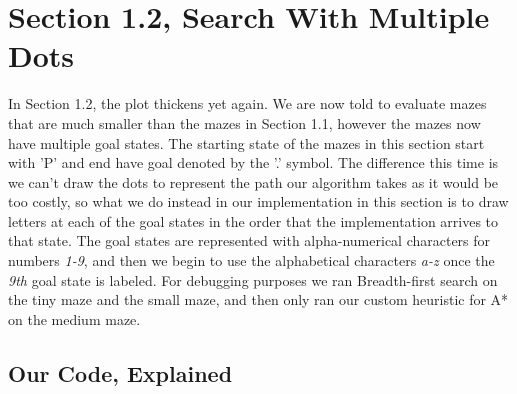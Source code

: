 \documentclass[titlepage]{article}
\begin{document}
\section{Section 1.2, Search With Multiple Dots} 
In Section 1.2, the plot thickens yet again. We are now told to evaluate mazes that are much smaller than the mazes in Section 1.1, however the mazes now have multiple goal states. The starting state of the mazes in this section start with 'P' and end have goal denoted by the '.' symbol. The difference this time is we can't draw the dots to represent the path our algorithm takes as it would be too costly, so what we do instead in our implementation in this section is to draw letters at each of the goal states in the order that the implementation arrives to that state. The goal states are represented with alpha-numerical characters for numbers \textit{1-9}, and then we begin to use the alphabetical characters \textit{a-z} once the \textit{9th} goal state is labeled. For debugging purposes we ran Breadth-first search on the tiny maze and the small maze, and then only ran our custom heuristic for A* on the medium maze. 

\subsection{Our Code, Explained}
\end{document}
